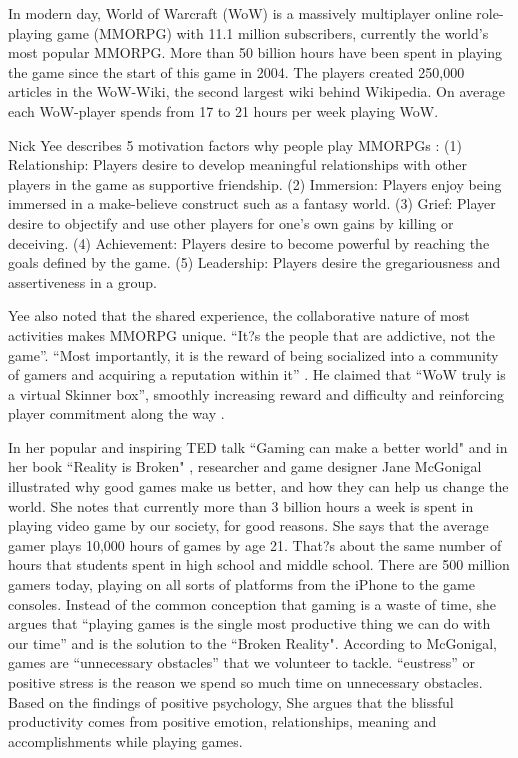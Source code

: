 In modern day, World of Warcraft (WoW) is a massively multiplayer online role-playing game (MMORPG) with 11.1 million subscribers, currently the world's most popular MMORPG.  More than 50 billion hours have been spent in playing the game since the start of this game in 2004. The players created 250,000 articles in the WoW-Wiki, the second largest wiki behind Wikipedia. On average each WoW-player spends from 17 to 21 hours per week playing WoW.

Nick Yee describes 5 motivation factors why people play MMORPGs \cite {yee2002facets}:  (1) Relationship: Players desire to develop meaningful relationships with other players in the game as supportive friendship. (2) Immersion: Players enjoy being immersed in a make-believe construct such as a fantasy world. (3) Grief: Player desire to objectify and use other players for one's own gains by killing or deceiving. (4) Achievement: Players desire to become powerful by reaching the goals defined by the game. (5) Leadership: Players desire the gregariousness and assertiveness in a group.

Yee also noted that the shared experience, the collaborative nature of most activities makes MMORPG unique. ``It?s the people that are addictive, not the game''. ``Most importantly, it is the reward of being socialized into a community of gamers and acquiring a reputation within it''  \cite {yee2002understanding}. He claimed that ``WoW truly is a virtual Skinner box'', smoothly increasing reward and difficulty and reinforcing player commitment along the way \cite {yee2001vsb}. 
	
In her popular and inspiring TED talk ``Gaming can make a better world" \cite {mcgonigal2010ted} and in her book ``Reality is Broken" \cite {mcgonigal2011reality}, researcher and game designer Jane McGonigal illustrated why good games make us better, and how they can help us change the world. She notes that currently more than 3 billion hours a week is spent in playing video game by our society, for good reasons. She says that the average gamer plays 10,000 hours of games by age 21. That?s about the same number of hours that students spent in high school and middle school. There are 500 million gamers today, playing on all sorts of platforms from the iPhone to the game consoles. Instead of the common conception that gaming is a waste of time, she argues that ``playing games is the single most productive thing we can do with our time'' and is the solution to the ``Broken Reality". According to McGonigal, games are ``unnecessary obstacles'' that we volunteer to tackle. ``eustress'' or positive stress is the reason we spend so much time on unnecessary obstacles. Based on the findings of positive psychology, She argues that the blissful productivity comes from positive emotion, relationships, meaning and accomplishments while playing games.

